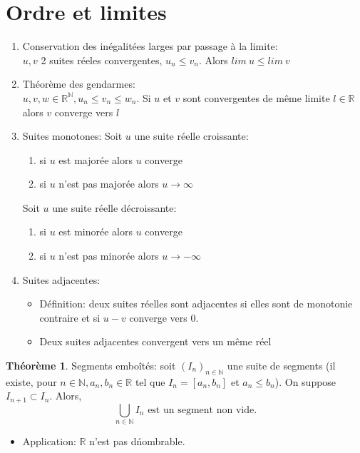 \documentclass[fleqn]{article}
\theoremstyle{definition} \newtheorem*{defi}{D\'efinition}
\theoremstyle{definition} \newtheorem*{theo}{Th\'eor\`eme}
\begin{document}
\section{Ordre et limites}
\begin{enumerate}
	\item Conservation des in\'egalit\'ees larges par passage \`a la limite: \\
		$u, v$ 2 suites r\'eeles convergentes, $u_n \leq v_n$. Alors $lim\ u \leq lim\ v$
	\item Th\'eor\`eme des gendarmes: \\
		$u, v, w \in \mathbb{R}^\mathbb{N}, u_n \leq v_n \leq w_n$. Si $u$ et $v$ sont convergentes de m\^eme limite $l \in \mathbb{R}$
		alors $v$ converge vers $l$
	\item Suites monotones:
		Soit $u$ une suite r\'eelle croissante:
		\begin{enumerate}
			\item si $u$ est major\'ee alors $u$ converge
			\item si $u$ n'est pas major\'ee alors $u \rightarrow \infty$
		\end{enumerate}
		Soit $u$ une suite r\'eelle d\'ecroissante:
		\begin{enumerate}
			\item si $u$ est minor\'ee alors $u$ converge
			\item si $u$ n'est pas minor\'ee alors $u \rightarrow -\infty$
		\end{enumerate}
	\item Suites adjacentes:
		\begin{itemize}
			\item D\'efinition: deux suites r\'eelles sont adjacentes si elles sont de monotonie contraire et si $u-v$ converge vers 0.
			\item Deux suites adjacentes convergent vers un m\^eme r\'eel
		\end{itemize}
\end{enumerate}
\begin{theo} Segments embo\^it\'es: soit $(I_n)_{n \in \mathbb{N}}$ une suite de segments (il existe, pour
	$n \in \mathbb{N}, a_n, b_n \in \mathbb{R}$ tel que $I_n = [a_n, b_n]$ et $a_n \leq b_n$). On suppose $I_{n+1} \subset I_n$. Alors,
	\[\bigcup_{n \in \mathbb{N}} I_n \text{ est un segment non vide.}\]
\end{theo}
	\begin{itemize}
		\item Application: $\mathbb{R}$ n'est pas d\'nombrable.
	\end{itemize}
\end{document}
